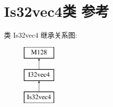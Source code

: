 \hypertarget{class_is32vec4}{}\section{Is32vec4类 参考}
\label{class_is32vec4}
类 Is32vec4 继承关系图\+:\begin{figure}[H]
\begin{center}
\leavevmode
\includegraphics[height=3.000000cm]{class_is32vec4}
\end{center}
\end{figure}
